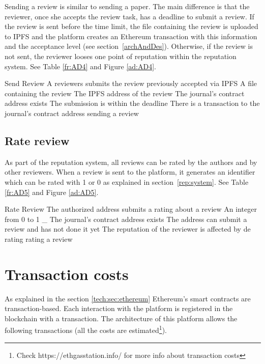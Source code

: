 Sending a review is similar to sending a paper. The main difference is that the
reviewer, once she accepts the review task, has a deadline to submit a review.
If the review is sent before the time limit, the file containing the review is
uploaded to IPFS and the platform creates an Ethereum transaction with this
information and the acceptance level (see section~\ref{archAndDes}). Otherwise,
if the review is not sent, the
reviewer looses one point of reputation within the reputation
system. See Table \ref{fr:AD4} and Figure \ref{ad:AD4}.

{Send Review}%
{A reviewers submits the review previously accepted via
  IPFS}%
{A file containing the review}%
{The IPFS address of the review}%
{The journal's contract address exists}%
{The submission is within the deadline}%
{There is a transaction to the journal's contract address}%
{sending a review}%

\subsection*{Rate review}

As part of the reputation system, all reviews can be rated by the authors and by
other reviewers. When a review is sent to the platform, it generates an
identifier which can be rated with 1 or 0 as explained in
section~\ref{rep:system}. See Table \ref{fr:AD5} and Figure \ref{ad:AD5}.

{Rate Review}%
{The authorized address submits a rating about a review}%
{An integer from 0 to 1}%
{_}%
{The journal's contract address exists}%
{The address can submit a review and has not done it yet}%
{The reputation of the reviewer is affected by de rating}%
{rating a review}%
\section{Transaction costs}
\label{arch:trans}

As explained in the section \ref{tech:sec:ethereum} Ethereum's smart contracts
are transaction-based. Each interaction with the platform is registered in the
blockchain with a transaction. The architecture of this platform allows the
following transactions (all the costs are estimated\footnote{Check
  https://ethgasstation.info/ for more info about transaction costs}).


